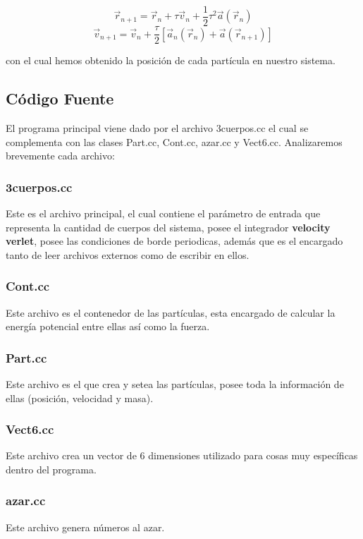 \documentclass[12pt]{article}
\begin{document}
$$\vec r_{n+1}=\vec r_n+\tau\vec v_n+\frac12\tau^2\vec a(\vec r_n)$$
$$\vec v_{n+1}=\vec v_n+\frac{\tau}{2}[\vec a_n(\vec r_n)+\vec a(\vec
r_{n+1})]$$

\noindent con el cual  hemos obtenido la posici\'on de cada part\'icula en
nuestro sistema.

\subsection {C\'odigo Fuente}

El programa principal viene dado por el archivo 3cuerpos.cc el cual se
complementa con las clases Part.cc, Cont.cc, azar.cc y Vect6.cc.
Analizaremos brevemente cada archivo:

\subsubsection{3cuerpos.cc} Este es el archivo principal, el cual
contiene el par\'ametro de entrada que representa la cantidad de
cuerpos del sistema, posee el integrador \textbf{velocity verlet},
posee las condiciones de borde periodicas, adem\'as
que es el encargado tanto de leer archivos externos como de escribir
en ellos.\\

\subsubsection{Cont.cc} Este archivo es el contenedor de las
part\'iculas, esta encargado de calcular la energ\'ia potencial
entre ellas as\'i como la fuerza.\\

\subsubsection{Part.cc} Este archivo es el que crea y setea las
part\'iculas, posee toda la informaci\'on de ellas (posici\'on,
velocidad y masa).\\

\subsubsection{Vect6.cc} Este archivo crea un vector de 6 dimensiones
utilizado para cosas muy espec\'ificas dentro del programa.\\

\subsubsection{azar.cc} Este archivo genera n\'umeros al azar.\\
\end{document}
